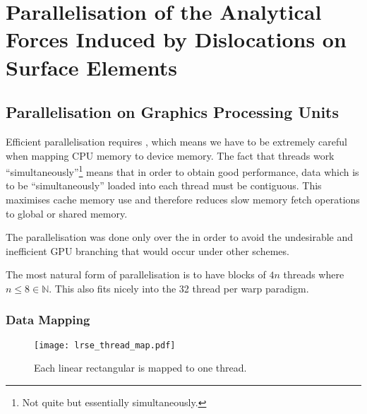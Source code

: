 \chapter{Parallelisation of the Analytical Forces Induced by Dislocations on Surface Elements}
\label{c:para_f_dln_se}
%
\section{Parallelisation on Graphics Processing Units}
Efficient parallelisation requires , which means we have to be extremely careful when mapping CPU memory to device memory. The fact that threads work ``simultaneously''\footnote{Not quite but essentially simultaneously.} means that in order to obtain good performance, data which is to be ``simultaneously'' loaded into each thread must be contiguous. This maximises cache memory use and therefore reduces slow memory fetch operations to global or shared memory.

The parallelisation was done only over the  in order to avoid the undesirable and inefficient GPU branching that would occur under other schemes.

The most natural form of parallelisation is to have blocks of $ 4n $ threads where $ n \leq 8 \in \mathbb{N}$. This also fits nicely into the 32 thread per warp paradigm.
%
\subsection{Data Mapping}
%
\begin{figure}
	\centering
	\texttt{[image: lrse\_thread\_map.pdf]}
	\caption[Linear rectangular surface element mapping.]{Each linear rectangular  is mapped to one thread.}
	\label{f:lrse_map}
\end{figure}
%

